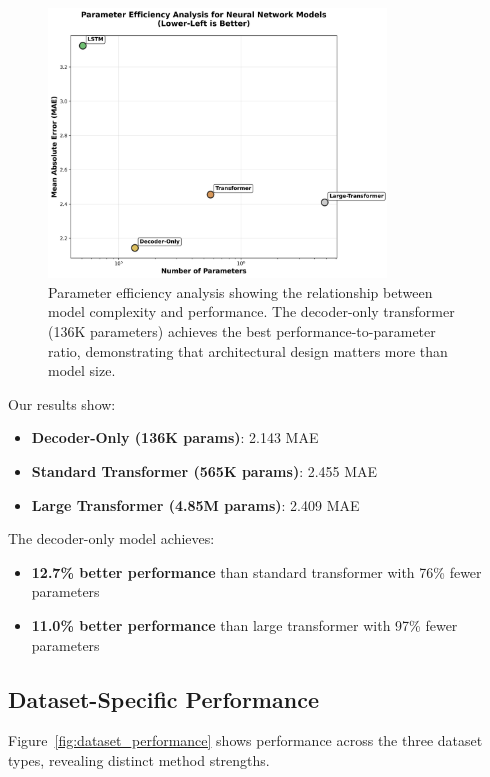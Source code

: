 \documentclass[11pt]{article}
\begin{document}
\begin{figure}[h]
\centering
\includegraphics[width=0.8\textwidth]{results/figure2_parameter_efficiency.png}
\caption{Parameter efficiency analysis showing the relationship between model complexity and performance. The decoder-only transformer (136K parameters) achieves the best performance-to-parameter ratio, demonstrating that architectural design matters more than model size.}
\label{fig:param_efficiency}
\end{figure}

Our results show:
\begin{itemize}
\item \textbf{Decoder-Only (136K params)}: 2.143 MAE
\item \textbf{Standard Transformer (565K params)}: 2.455 MAE  
\item \textbf{Large Transformer (4.85M params)}: 2.409 MAE
\end{itemize}

The decoder-only model achieves:
\begin{itemize}
\item \textbf{12.7\% better performance} than standard transformer with 76\% fewer parameters
\item \textbf{11.0\% better performance} than large transformer with 97\% fewer parameters
\end{itemize}

\subsection{Dataset-Specific Performance}

Figure~\ref{fig:dataset_performance} shows performance across the three dataset types, revealing distinct method strengths.
\end{document}
